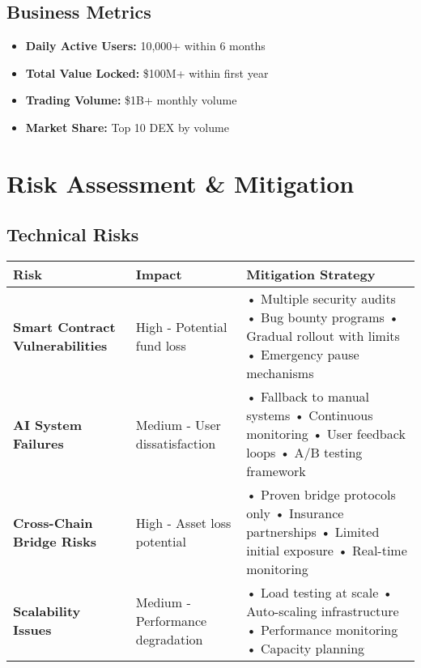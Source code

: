 \documentclass{article}
\begin{document}
\subsection{Business Metrics}
\begin{itemize}[leftmargin=*]
    \item \textbf{Daily Active Users:} 10,000+ within 6 months
    \item \textbf{Total Value Locked:} \$100M+ within first year
    \item \textbf{Trading Volume:} \$1B+ monthly volume
    \item \textbf{Market Share:} Top 10 DEX by volume
\end{itemize}

\section{Risk Assessment \& Mitigation}

\subsection{Technical Risks}
\begin{longtable}{|p{}|p{}|p{}|}
\hline
\textbf{Risk} & \textbf{Impact} & \textbf{Mitigation Strategy} \\
\hline
\textbf{Smart Contract Vulnerabilities} & 
High - Potential fund loss & 
• Multiple security audits \newline
• Bug bounty programs \newline
• Gradual rollout with limits \newline
• Emergency pause mechanisms \\
\hline
\textbf{AI System Failures} & 
Medium - User dissatisfaction & 
• Fallback to manual systems \newline
• Continuous monitoring \newline
• User feedback loops \newline
• A/B testing framework \\
\hline
\textbf{Cross-Chain Bridge Risks} & 
High - Asset loss potential & 
• Proven bridge protocols only \newline
• Insurance partnerships \newline
• Limited initial exposure \newline
• Real-time monitoring \\
\hline
\textbf{Scalability Issues} & 
Medium - Performance degradation & 
• Load testing at scale \newline
• Auto-scaling infrastructure \newline
• Performance monitoring \newline
• Capacity planning \\
\hline
\end{longtable}
\end{document}
